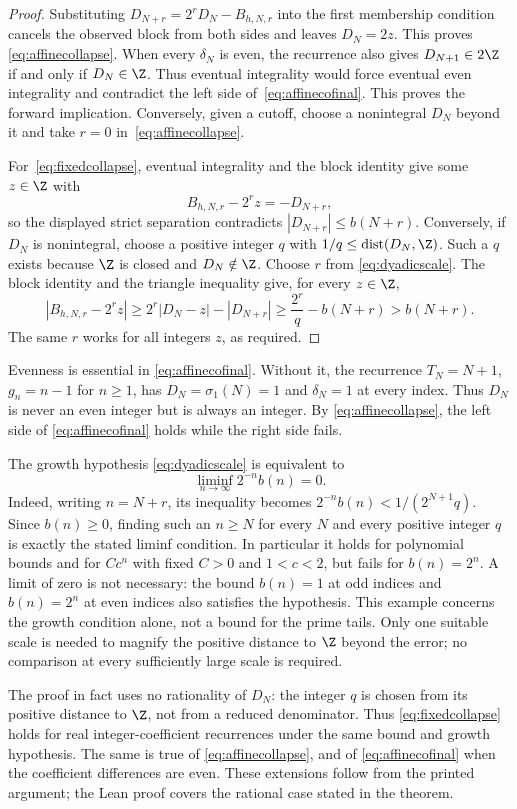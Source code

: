 \begin{proof}
Substituting $D_{N+r}=2^rD_N-B_{h,N,r}$ into the first membership condition cancels the
observed block from both sides and leaves $D_N=2z$.  This proves
\eqref{eq:affinecollapse}.  When every $\delta_N$ is even, the recurrence
also gives $D_{N+1}\in2\Z$ if and only if $D_N\in\Z$.
Thus eventual integrality would force eventual even integrality and
contradict the left side of~\eqref{eq:affinecofinal}.  This proves the
forward implication.  Conversely, given a cutoff, choose a nonintegral
$D_N$ beyond it and take $r=0$ in~\eqref{eq:affinecollapse}.

For~\eqref{eq:fixedcollapse}, eventual integrality and the block identity give
some $z\in\Z$ with
\[
 B_{h,N,r}-2^rz=-D_{N+r},
\]
so the displayed strict separation contradicts $|D_{N+r}|\le b(N+r)$.
Conversely, if $D_N$ is nonintegral, choose a positive integer $q$ with
$1/q\le\operatorname{dist}(D_N,\Z)$.  Such a $q$ exists because $\Z$ is
closed and $D_N\notin\Z$.  Choose $r$ from \eqref{eq:dyadicscale}.  The block identity and the triangle inequality
give, for every $z\in\Z$,
\[
 |B_{h,N,r}-2^rz|
 \ge 2^r|D_N-z|-|D_{N+r}|
 \ge \frac{2^r}{q}-b(N+r)>b(N+r).
\]
The same $r$ works for all integers $z$, as required.
\end{proof}

Evenness is essential in \eqref{eq:affinecofinal}.  Without it, the
recurrence $T_N=N+1$, $g_n=n-1$ for $n\ge1$, has
$D_N=\sigma_1(N)=1$ and $\delta_N=1$ at every index.  Thus $D_N$ is never
an even integer but is always an integer.  By
\eqref{eq:affinecollapse}, the left side of
\eqref{eq:affinecofinal} holds while the right side fails.

The growth hypothesis \eqref{eq:dyadicscale} is equivalent to
\[
 \liminf_{n\to\infty}2^{-n}b(n)=0.
\]
Indeed, writing $n=N+r$, its inequality becomes
$2^{-n}b(n)<1/(2^{N+1}q)$.  Since $b(n)\ge0$, finding such an $n\ge N$
for every $N$ and every positive integer $q$ is exactly the stated
liminf condition.  In particular it holds for polynomial bounds and for
$Cc^n$ with fixed $C>0$ and $1<c<2$, but fails for $b(n)=2^n$.
A limit of zero is not necessary: the bound $b(n)=1$ at odd indices and
$b(n)=2^n$ at even indices also satisfies the hypothesis.  This example
concerns the growth condition alone, not a bound for the prime tails.
Only one suitable scale is needed to magnify the positive distance to
$\Z$ beyond the error; no comparison at every sufficiently large scale
is required.

The proof in fact uses no rationality of $D_N$: the integer $q$ is chosen
from its positive distance to $\Z$, not from a reduced denominator.
Thus \eqref{eq:fixedcollapse} holds for real integer-coefficient
recurrences under the same bound and growth hypothesis.  The same is
true of \eqref{eq:affinecollapse}, and of \eqref{eq:affinecofinal} when the
coefficient differences are even.  These extensions follow from the
printed argument; the Lean proof covers the rational case stated in the
theorem.

